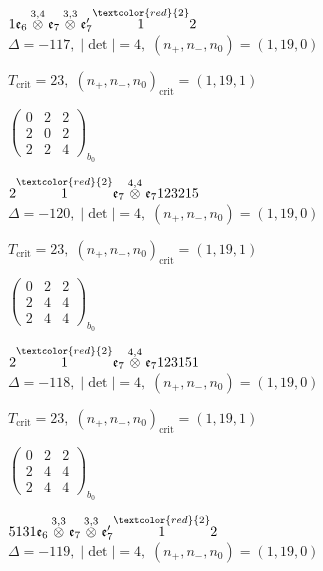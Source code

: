 \documentclass[10pt]{article}
\begin{document}
$1\mathfrak{e}_6\overset{3,4}{\otimes}\mathfrak{e}_7\overset{3,3}{\otimes}\mathfrak{e}_7'\overset{\textcolor{red}{2}}{1}2$ \quad $\Delta=-117,\; |\det|=4,\; (n_+,n_-,n_0)=(1,19,0)$

\hspace{1em}$T_{\text{crit}}=23,\; (n_+,n_-,n_0)_{\text{crit}}=(1,19,1)$

\hspace{2em}$\left(\begin{smallmatrix}0 & 2 & 2 \\ 2 & 0 & 2 \\ 2 & 2 & 4\end{smallmatrix}\right)_{\!b_0}$

\smallskip

$2\overset{\textcolor{red}{2}}{1}\mathfrak{e}_7\overset{4,4}{\otimes}\mathfrak{e}_7123215$ \quad $\Delta=-120,\; |\det|=4,\; (n_+,n_-,n_0)=(1,19,0)$

\hspace{1em}$T_{\text{crit}}=23,\; (n_+,n_-,n_0)_{\text{crit}}=(1,19,1)$

\hspace{2em}$\left(\begin{smallmatrix}0 & 2 & 2 \\ 2 & 4 & 4 \\ 2 & 4 & 4\end{smallmatrix}\right)_{\!b_0}$

\smallskip

$2\overset{\textcolor{red}{2}}{1}\mathfrak{e}_7\overset{4,4}{\otimes}\mathfrak{e}_7123151$ \quad $\Delta=-118,\; |\det|=4,\; (n_+,n_-,n_0)=(1,19,0)$

\hspace{1em}$T_{\text{crit}}=23,\; (n_+,n_-,n_0)_{\text{crit}}=(1,19,1)$

\hspace{2em}$\left(\begin{smallmatrix}0 & 2 & 2 \\ 2 & 4 & 4 \\ 2 & 4 & 4\end{smallmatrix}\right)_{\!b_0}$

\smallskip

$5131\mathfrak{e}_6\overset{3,3}{\otimes}\mathfrak{e}_7\overset{3,3}{\otimes}\mathfrak{e}_7'\overset{\textcolor{red}{2}}{1}2$ \quad $\Delta=-119,\; |\det|=4,\; (n_+,n_-,n_0)=(1,19,0)$
\end{document}
